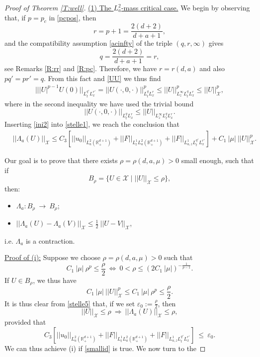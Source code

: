\documentclass[10pt,a4paper]{amsart}
\def \RN {\mathbb{R}_+^{d+1}}
\newcommand{\Xs}{\mathcal X}
\newcommand{\ve}{\varepsilon}
\begin{document}
\begin{proof}[Proof of Theorem \ref{T:well}]
\noindent \underline{(1) The $L^2_a$-mass critical case.} We begin by observing that, if $p = p_c$ in \eqref{pcpos}, then 
\[
r = p+1 = \frac{2(d+2)}{d+a+1},
\]
and the compatibility assumption \eqref{acinfty} of the triple $(q,r,\infty)$ gives
\[
q = \frac{2(d+2)}{d+a+1} = r,
\]
see Remarks \ref{R:rr} and \ref{R:pc}.
Therefore, we have $r = r(d,a)$ and also $pq' = p r' = q$. From this fact and \eqref{UU} we thus find
\begin{align}\label{ini2}
|||U|^{p-1}U(0)||_{L^{q'}_t L^{r'}_x} = ||U(\cdot,0,\cdot)||^p_{L^{q}_t L^{r}_x} \le ||U||^p_{L^\infty_z L^{q}_t L^{r}_x }\le ||U||_{\Xs}^p,
\end{align}
where in the second inequality we have used the trivial bound
\begin{equation}\label{triv}
||U(\cdot,0,\cdot)||_{L^{q}_t L^{r}_x} \le ||U||_{L^\infty_z L^{q}_t L^{r}_x }.
\end{equation} 
Inserting \eqref{ini2} into \eqref{stelle1}, we reach the conclusion that 
\begin{align}\label{stelle5}
&  ||\Lambda_a(U)||_{\Xs} \le C_3 \left[||u_0||_{L^2_a(\RN)} + ||F||_{L^1_t L^2_a(\RN)} + ||F||_{L^1_{a,z} L^{q'}_t L^{r'}_x }\right] + C_1\ |\mu|\ ||U||_{\Xs}^p.
\end{align}


Our goal is to prove that there exists $\rho = \rho(d,a,\mu)>0$ small enough, such that if 
\[
B_\rho = \{U\in \Xs\mid ||U||_{\Xs}\le \rho\},
\]
then:
\begin{itemize}
\item[(i)] $\Lambda_a : B_\rho\ \longrightarrow\ B_\rho$;
\\
\item[(ii)] $||\Lambda_a(U) -\Lambda_a(V)||_{\Xs} \le \frac 12\ ||U-V||_{\Xs}$,
\end{itemize}
i.e. $\Lambda_a$ is a contraction. 

\vskip 0.2in

\noindent \underline{Proof of (i):} Suppose we choose $\rho = \rho(d,a,\mu)>0$ such that
\begin{equation}\label{rho}
C_1\ |\mu|\ \rho^p \le \frac{\rho}2\ \Longleftrightarrow\ 0< \rho \le (2 C_1\ |\mu|)^{-\frac{1}{p-1}}.  
\end{equation}
If $U\in B_\rho$, we thus have 
\[
C_1\ |\mu|\ ||U||_{\Xs}^p \le C_1\ |\mu|\ \rho^p \le \frac{\rho}2.
\]
It is thus clear from \eqref{stelle5} that, if we set $\ve_0 := \frac{\rho}2$, then 
\[
||U||_{\Xs}\le \rho\ \Longrightarrow\ ||\Lambda_a(U)||_{\Xs}\le \rho,
\]
provided that
\begin{equation}\label{smallid}
C_3 \left[||u_0||_{L^2_a(\RN)} + ||F||_{L^1_t L^2_a(\RN)} + ||F||_{L^1_{a,z} L^{q'}_t L^{r'}_x }\right]\  \le\ \ve_0.
\end{equation}
We can thus achieve (i) if \eqref{smallid} is true. We now turn to the 


\end{proof}
\end{document}
